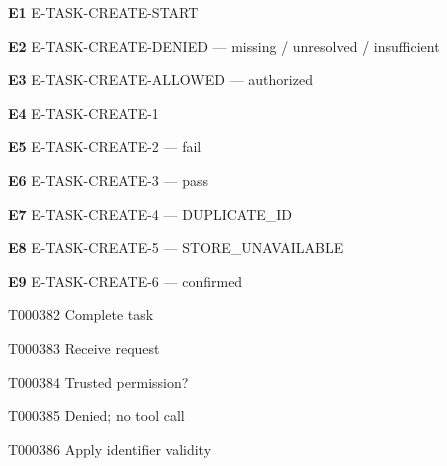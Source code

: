 \documentclass[11pt,a4paper]{article}
\begin{document}
\noindent\textbf{E1} E-TASK-CREATE-START\par
\noindent\textbf{E2} E-TASK-CREATE-DENIED --- missing / unresolved / insufficient\par
\noindent\textbf{E3} E-TASK-CREATE-ALLOWED --- authorized\par
\noindent\textbf{E4} E-TASK-CREATE-1\par
\noindent\textbf{E5} E-TASK-CREATE-2 --- fail\par
\noindent\textbf{E6} E-TASK-CREATE-3 --- pass\par
\noindent\textbf{E7} E-TASK-CREATE-4 --- DUPLICATE\_ID\par
\noindent\textbf{E8} E-TASK-CREATE-5 --- STORE\_UNAVAILABLE\par
\noindent\textbf{E9} E-TASK-CREATE-6 --- confirmed\par
\endgroup
\clearpage
\begin{atlastext}{T000382}
Complete task
\end{atlastext}
\begin{atlastext}{T000383}
Receive request
\end{atlastext}
\begin{atlastext}{T000384}
Trusted permission?
\end{atlastext}
\begin{atlastext}{T000385}
Denied; no tool call
\end{atlastext}
\begin{atlastext}{T000386}
Apply identifier validity
\end{atlastext}
\end{document}
